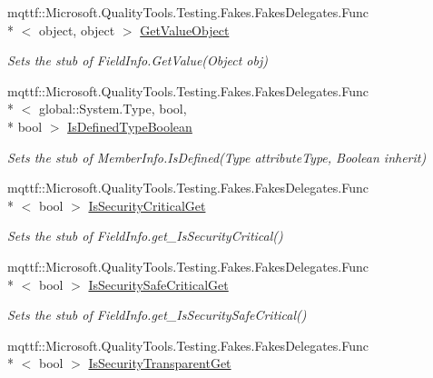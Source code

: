 \begin{DoxyCompactItemize}
mqttf\-::\-Microsoft.\-Quality\-Tools.\-Testing.\-Fakes.\-Fakes\-Delegates.\-Func\\*
$<$ object, object $>$ \hyperlink{class_system_1_1_reflection_1_1_fakes_1_1_stub_field_info_a0c060d909a8b5476213abab2214ad501}{Get\-Value\-Object}
\begin{DoxyCompactList}\small\item\em Sets the stub of Field\-Info.\-Get\-Value(\-Object obj)\end{DoxyCompactList}\item 
mqttf\-::\-Microsoft.\-Quality\-Tools.\-Testing.\-Fakes.\-Fakes\-Delegates.\-Func\\*
$<$ global\-::\-System.\-Type, bool, \\*
bool $>$ \hyperlink{class_system_1_1_reflection_1_1_fakes_1_1_stub_field_info_accd8aad06c3c1175a0ce86b570ed6150}{Is\-Defined\-Type\-Boolean}
\begin{DoxyCompactList}\small\item\em Sets the stub of Member\-Info.\-Is\-Defined(\-Type attribute\-Type, Boolean inherit)\end{DoxyCompactList}\item 
mqttf\-::\-Microsoft.\-Quality\-Tools.\-Testing.\-Fakes.\-Fakes\-Delegates.\-Func\\*
$<$ bool $>$ \hyperlink{class_system_1_1_reflection_1_1_fakes_1_1_stub_field_info_a8a85039a5c3dfcf93a7befa778d98794}{Is\-Security\-Critical\-Get}
\begin{DoxyCompactList}\small\item\em Sets the stub of Field\-Info.\-get\-\_\-\-Is\-Security\-Critical()\end{DoxyCompactList}\item 
mqttf\-::\-Microsoft.\-Quality\-Tools.\-Testing.\-Fakes.\-Fakes\-Delegates.\-Func\\*
$<$ bool $>$ \hyperlink{class_system_1_1_reflection_1_1_fakes_1_1_stub_field_info_a21aa3c733188ed0331d2039345e1f6c5}{Is\-Security\-Safe\-Critical\-Get}
\begin{DoxyCompactList}\small\item\em Sets the stub of Field\-Info.\-get\-\_\-\-Is\-Security\-Safe\-Critical()\end{DoxyCompactList}\item 
mqttf\-::\-Microsoft.\-Quality\-Tools.\-Testing.\-Fakes.\-Fakes\-Delegates.\-Func\\*
$<$ bool $>$ \hyperlink{class_system_1_1_reflection_1_1_fakes_1_1_stub_field_info_a841eab07b1004e3cb80d2577040784dd}{Is\-Security\-Transparent\-Get}

\end{DoxyCompactItemize}
